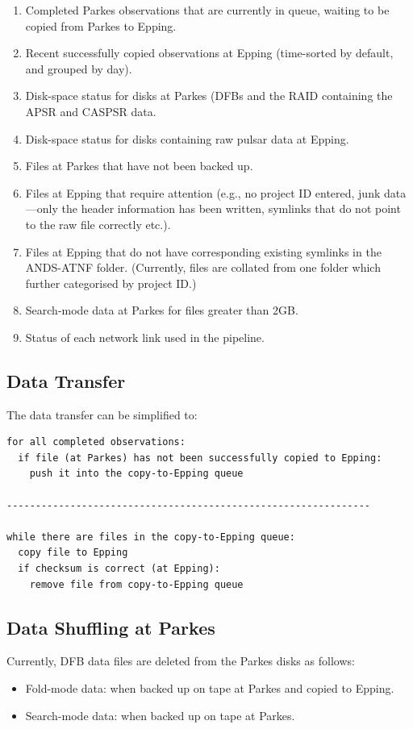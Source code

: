 \documentclass[a4paper,11pt]{article}
\begin{document}
\begin{enumerate}
\item Completed Parkes observations that are currently in queue, waiting to be copied from Parkes to Epping.
\item Recent successfully copied observations at Epping (time-sorted by default, and grouped by day).
\item Disk-space status for disks at Parkes (DFBs and the RAID containing the APSR and CASPSR data.
\item Disk-space status for disks containing raw pulsar data at Epping.
\item Files at Parkes that have not been backed up.
\item Files at Epping that require attention (e.g., no project ID entered, junk data---only the header information has been written, symlinks that do not point to the raw file correctly etc.).
\item Files at Epping that do not have corresponding existing symlinks in the ANDS-ATNF folder. (Currently, files are collated from one folder which further categorised by project ID.)
\item Search-mode data at Parkes for files greater than 2GB.
\item Status of each network link used in the pipeline.
\end{enumerate}

\subsection{Data Transfer}

The data transfer can be simplified to:
\begin{verbatim}
for all completed observations: 
  if file (at Parkes) has not been successfully copied to Epping:
    push it into the copy-to-Epping queue

---------------------------------------------------------------

while there are files in the copy-to-Epping queue:
  copy file to Epping
  if checksum is correct (at Epping):
    remove file from copy-to-Epping queue
\end{verbatim}

\subsection{Data Shuffling at Parkes}
Currently, DFB data files are deleted from the Parkes disks as follows:
\begin{itemize}
\item Fold-mode data: when backed up on tape at Parkes and copied to Epping.
\item Search-mode data: when backed up on tape at Parkes.
\end{itemize}
\end{document}
